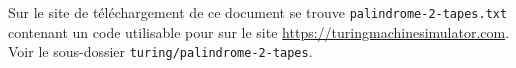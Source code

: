Sur le site de téléchargement de ce document se trouve \verb+palindrome-2-tapes.txt+ contenant un code utilisable pour sur le site \url{https://turingmachinesimulator.com}. Voir le sous-dossier \verb+turing/palindrome-2-tapes+.